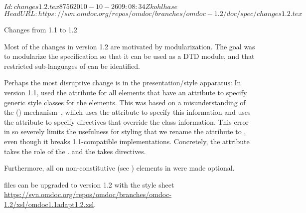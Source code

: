 \svnInfo $Id: changes1.2.tex 8756 2010-10-26 09:08:34Z kohlhase $
\svnKeyword $HeadURL: https://svn.omdoc.org/repos/omdoc/branches/omdoc-1.2/doc/spec/changes1.2.tex $

\begin{tsection}[id=changes1.2]{Changes from 1.1 to 1.2}

  Most of the changes in version 1.2 are motivated by modularization. The goal was
  to modularize the specification so that it can be used as a DTD module, and that
  restricted sub-languages of {\omdoc} can be identified. 
  
  Perhaps the most disruptive change is in the presentation/style apparatus: In version
  1.1, {\omdoc} used the {} attribute for all elements that have an
  {} attribute to specify generic style classes for the {\omdoc}
  elements.  This was based on a misunderstanding of the {\xml} {} ({\css}) mechanism~\cite{BosHak:css98}, which uses the
  {} attribute to specify this information and uses the
  {} attribute to specify {\css} directives
  that override the class information.  This error in {} so severely limits
  the usefulness for styling that we rename the {}
  {} attribute to
  {}, even though it breaks 1.1-compatible
  implementations. Concretely, the {} {} attribute takes
  the role of the {} {}. and the {} {}\label{style/class-comment} takes {\css} directives.

  Furthermore, all {} on non-constitutive (see
  {}) elements in {\omdoc} were made optional.
  
  {} files can be upgraded to version 1.2 with the {\xslt} style sheet
    \url{https://svn.omdoc.org/repos/omdoc/branches/omdoc-1.2/xsl/omdoc1.1adapt1.2.xsl}.


\end{tsection}
